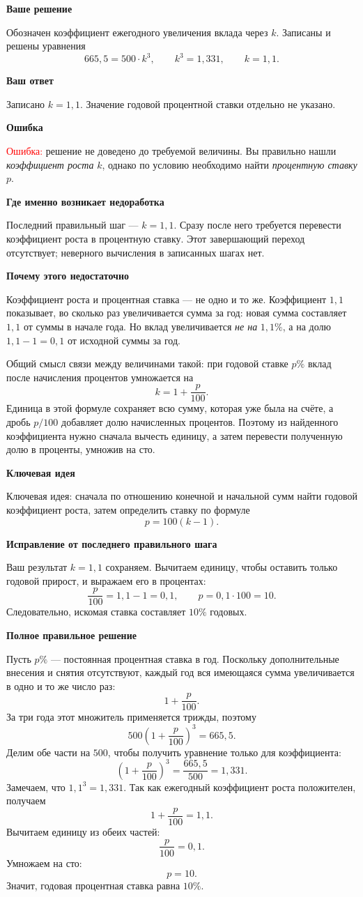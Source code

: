 \documentclass[12pt,a4paper]{article}
\newcommand{\rubric}[1]{\par\smallskip\noindent\textbf{#1}\par\nobreak\smallskip}
\begin{document}
\rubric{Ваше решение}
Обозначен коэффициент ежегодного увеличения вклада через $k$. Записаны и решены уравнения
\[
665{,}5=500\cdot k^3,\qquad
k^3=1{,}331,\qquad
k=1{,}1.
\]

\rubric{Ваш ответ}
Записано $k=1{,}1$. Значение годовой процентной ставки отдельно не указано.

\rubric{Ошибка}
\textcolor{red}{Ошибка:} решение не доведено до требуемой величины. Вы правильно нашли \emph{коэффициент роста} $k$, однако по условию необходимо найти \emph{процентную ставку} $p$.

\rubric{Где именно возникает недоработка}
Последний правильный шаг --- $k=1{,}1$. Сразу после него требуется перевести коэффициент роста в процентную ставку. Этот завершающий переход отсутствует; неверного вычисления в записанных шагах нет.

\rubric{Почему этого недостаточно}
Коэффициент роста и процентная ставка --- не одно и то же. Коэффициент $1{,}1$ показывает, во сколько раз увеличивается сумма за год: новая сумма составляет $1{,}1$ от суммы в начале года. Но вклад увеличивается \emph{не на} $1{,}1\%$, а на долю $1{,}1-1=0{,}1$ от исходной суммы за год.

Общий смысл связи между величинами такой: при годовой ставке $p\%$ вклад после начисления процентов умножается на
\[
k=1+\frac{p}{100}.
\]
Единица в этой формуле сохраняет всю сумму, которая уже была на счёте, а дробь $p/100$ добавляет долю начисленных процентов. Поэтому из найденного коэффициента нужно сначала вычесть единицу, а затем перевести полученную долю в проценты, умножив на сто.

\rubric{Ключевая идея}
\textcolor{blue!60!black}{Ключевая идея:} сначала по отношению конечной и начальной сумм найти годовой коэффициент роста, затем определить ставку по формуле
\[
p=100(k-1).
\]

\rubric{Исправление от последнего правильного шага}
Ваш результат $k=1{,}1$ сохраняем. Вычитаем единицу, чтобы оставить только годовой прирост, и выражаем его в процентах:
\[
\frac{p}{100}=1{,}1-1=0{,}1,\qquad
p=0{,}1\cdot100=10.
\]
Следовательно, искомая ставка составляет $10\%$ годовых.

\rubric{Полное правильное решение}
Пусть $p\%$ --- постоянная процентная ставка в год. Поскольку дополнительные внесения и снятия отсутствуют, каждый год вся имеющаяся сумма увеличивается в одно и то же число раз:
\[
1+\frac{p}{100}.
\]
За три года этот множитель применяется трижды, поэтому
\[
500\left(1+\frac{p}{100}\right)^3=665{,}5.
\]
Делим обе части на $500$, чтобы получить уравнение только для коэффициента:
\[
\left(1+\frac{p}{100}\right)^3
=\frac{665{,}5}{500}=1{,}331.
\]
Замечаем, что $1{,}1^3=1{,}331$. Так как ежегодный коэффициент роста положителен, получаем
\[
1+\frac{p}{100}=1{,}1.
\]
Вычитаем единицу из обеих частей:
\[
\frac{p}{100}=0{,}1.
\]
Умножаем на сто:
\[
p=10.
\]
Значит, годовая процентная ставка равна $10\%$.
\end{document}
